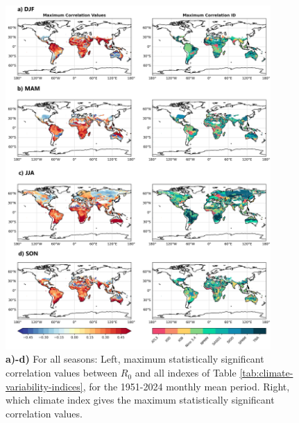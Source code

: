 \documentclass[10pt,twocolumn]{wlscirep}
\begin{document}
\begin{figure}[!ht]
  \centering
  \includegraphics[width=0.9\textwidth]{correlation_final_global_ps.png}
  \caption{\textbf{a)-d)} For all seasons: Left, maximum statistically significant correlation values between $R_0$ and all indexes of Table \ref{tab:climate-variability-indices}, for the 1951-2024 monthly mean period. Right, which climate index gives the maximum statistically significant correlation values.}
  \label{fig:global-correlation-final}
\end{figure}
\end{document}
